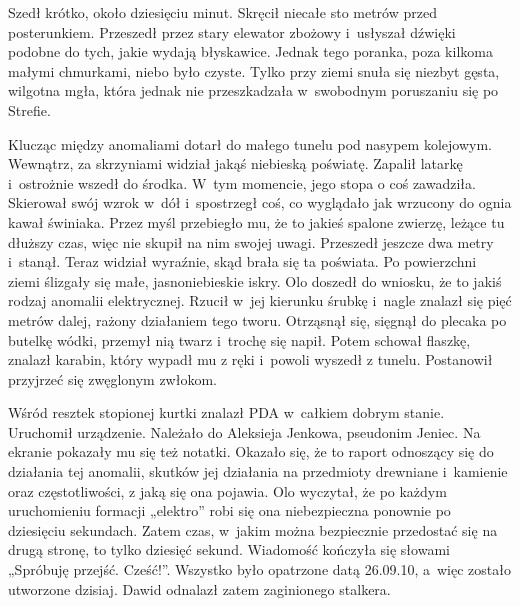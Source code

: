 \documentclass[../MAIN.tex]{subfiles}
\begin{document}
Szedł krótko, około dziesięciu minut. Skręcił niecałe sto metrów przed posterunkiem. Przeszedł przez stary elewator zbożowy i~usłyszał dźwięki podobne do tych, jakie wydają błyskawice. Jednak tego poranka, poza kilkoma małymi chmurkami, niebo było czyste. Tylko przy ziemi snuła się niezbyt gęsta, wilgotna mgła, która jednak nie przeszkadzała w~swobodnym poruszaniu się po Strefie.

Klucząc między anomaliami dotarł do małego tunelu pod nasypem kolejowym. Wewnątrz, za skrzyniami widział jakąś niebieską poświatę. Zapalił latarkę i~ostrożnie wszedł do środka. W~tym momencie, jego stopa o coś zawadziła. Skierował swój wzrok w~dół i~spostrzegł coś, co wyglądało jak wrzucony do ognia kawał świniaka. Przez myśl przebiegło mu, że to jakieś spalone zwierzę, leżące tu dłuższy czas, więc nie skupił na nim swojej uwagi. Przeszedł jeszcze dwa metry i~stanął. Teraz widział wyraźnie, skąd brała się ta poświata. Po powierzchni ziemi ślizgały się małe, jasnoniebieskie iskry. Olo doszedł do wniosku, że to jakiś rodzaj anomalii elektrycznej. Rzucił w~jej kierunku śrubkę i~nagle znalazł się pięć metrów dalej, rażony działaniem tego tworu. Otrząsnął się, sięgnął do plecaka po butelkę wódki, przemył nią twarz i~trochę się napił. Potem schował flaszkę, znalazł karabin, który wypadł mu z ręki i~powoli wyszedł z tunelu. Postanowił przyjrzeć się zwęglonym zwłokom.

Wśród resztek stopionej kurtki znalazł PDA w~całkiem dobrym stanie. Uruchomił urządzenie. Należało do Aleksieja Jenkowa, pseudonim Jeniec. Na ekranie pokazały mu się też notatki. Okazało się, że to raport odnoszący się do działania tej anomalii, skutków jej działania na przedmioty drewniane i~kamienie oraz częstotliwości, z jaką się ona pojawia. Olo wyczytał, że po każdym uruchomieniu formacji „elektro” robi się ona niebezpieczna ponownie po dziesięciu sekundach. Zatem czas, w~jakim można bezpiecznie przedostać się na drugą stronę, to tylko dziesięć sekund. Wiadomość kończyła się słowami „Spróbuję przejść. Cześć!”. Wszystko było opatrzone datą 26.09.10, a~więc zostało utworzone dzisiaj. Dawid odnalazł zatem zaginionego stalkera.
\end{document}
